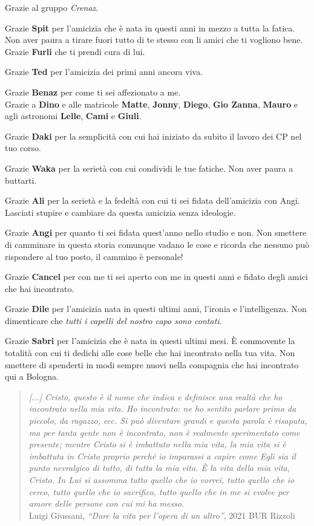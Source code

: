 \newpage

Grazie al gruppo \textit{Crenaz}.

Grazie \textbf{Spit} per l'amicizia che è nata in questi anni in mezzo a tutta la fatica. Non aver paura a tirare fuori tutto di te stesso con li amici che ti vogliono bene. Grazie \textbf{Furli} che ti prendi cura di lui.

Grazie \textbf{Ted} per l'amicizia dei primi anni ancora viva.

Grazie \textbf{Benaz} per come ti sei affezionato a me. \\


Grazie a \textbf{Dino} e alle matricole \textbf{Matte}, \textbf{Jonny}, \textbf{Diego}, \textbf{Gio Zanna}, \textbf{Mauro} e agli astronomi \textbf{Lelle}, \textbf{Cami} e \textbf{Giuli}.

Grazie \textbf{Daki} per la semplicità con cui hai iniziato da subito il lavoro dei CP nel tuo corso.

Grazie \textbf{Waka} per la serietà con cui condividi le tue fatiche. Non aver paura a buttarti.

Grazie \textbf{Ali} per la serietà e la fedeltà con cui ti sei fidata dell'amicizia con Angi. Lasciati stupire e cambiare da questa amicizia senza ideologie.

Grazie \textbf{Angi} per quanto ti sei fidata quest'anno nello studio e non. Non smettere di camminare in questa storia comunque vadano le cose e ricorda che nessuno può rispondere al tuo posto, il cammino è personale!

Grazie \textbf{Cancel} per con me ti sei aperto con me in questi anni e fidato degli amici che hai incontrato.

Grazie \textbf{Dile} per l'amicizia nata in questi ultimi anni, l'ironia e l'intelligenza. Non dimenticare che \textit{tutti i capelli del nostro capo sono contati}.

Grazie \textbf{Sabri} per l'amicizia che è nata in questi ultimi mesi. È commovente la totalità con cui ti dedichi alle cose belle che hai incontrato nella tua vita. Non smettere di spenderti in modi sempre nuovi nella compagnia che hai incontrato qui a Bologna.

\begin{quote}
    \emph{[...] Cristo, questo è il nome che indica e definisce una realtà che ho incontrato nella mia vita. Ho incontrato: ne ho sentito parlare prima da piccolo, da ragazzo, ecc. Si può diventare grandi e questa parola è risaputa, ma per tanta gente non è incontrato, non è realmente sperimentato come presente; mentre Cristo si è imbattuto nella mia vita, la mia vita si è imbattuta in Cristo proprio perché io imparassi a capire come Egli sia il punto nevralgico di tutto, di tutta la mia vita. \emph{È la vita della mia vita, Cristo.} In Lui si assomma tutto quello che io vorrei, tutto quello che io cerco, tutto quello che io sacrifico, tutto quello che in me si evolve per amore delle persone con cui mi ha messo.} \\
    Luigi Giussani, \textit{``Dare la vita per l'opera di un altro''}, 2021 BUR Rizzoli
\end{quote}

